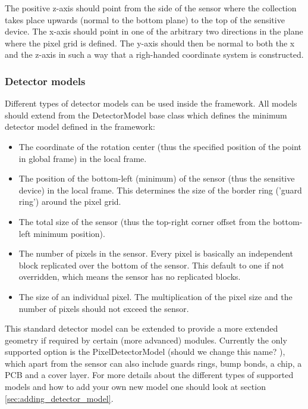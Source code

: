 The positive z-axis should point from the side of the sensor where the collection takes place upwards (normal to the bottom plane) to the top of the sensitive device. The x-axis should point in one of the arbitrary two directions in the plane where the pixel grid is defined. The y-axis should then be normal to both the x and the z-axis in such a way that a righ-handed coordinate system is constructed. 

\subsubsection{Detector models}
\label{sec:detector_models}
Different types of detector models can be used inside the framework. All models should extend from the DetectorModel base class which defines the minimum detector model defined in the framework:
\begin{itemize}
\item The coordinate of the rotation center (thus the specified position of the point in global frame) in the local frame.
\item The position of the bottom-left (minimum) of the sensor (thus the sensitive device) in the local frame. This determines the size of the border ring ('guard ring') around the pixel grid. 
\item The total size of the sensor (thus the top-right corner offset from the bottom-left minimum position).
\item The number of pixels in the sensor. Every pixel is basically an independent block replicated over the bottom of the sensor. This default to one if not overridden, which means the sensor has no replicated blocks.
\item The size of an individual pixel. The multiplication of the pixel size and the number of pixels should not exceed the sensor.
\end{itemize}

This standard detector model can be extended to provide a more extended geometry if required by certain (more advanced) modules. Currently the only supported option is the PixelDetectorModel (\todo should we change this name? \todo), which apart from the sensor can also include guards rings, bump bonds, a chip, a PCB and a cover layer. For more details about the different types of supported models and how to add your own new model one should look at section \ref{sec:adding_detector_model}.

